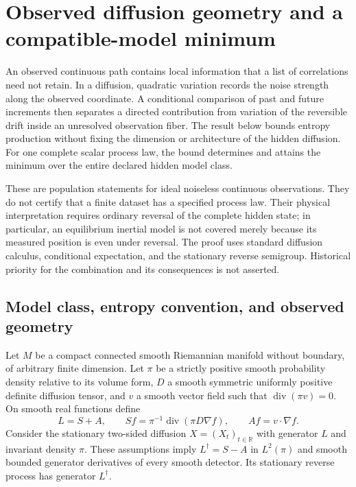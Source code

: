 \chapter{Observed diffusion geometry and a compatible-model minimum}
\label{ch:og-population}

An observed continuous path contains local information that a list of
correlations need not retain. In a diffusion, quadratic variation records the
noise strength along the observed coordinate. A conditional comparison of
past and future increments then separates a directed contribution from
variation of the reversible drift inside an unresolved observation fiber.
The result below bounds entropy production without fixing the dimension or
architecture of the hidden diffusion. For one complete scalar process law,
the bound determines and attains the minimum over the entire declared hidden
model class.

These are population statements for ideal noiseless continuous observations.
They do not certify that a finite dataset has a specified process law. Their
physical interpretation requires ordinary reversal of the complete hidden
state; in particular, an equilibrium inertial model is not covered merely
because its measured position is even under reversal. The proof uses standard
diffusion calculus, conditional expectation, and the stationary reverse
semigroup. Historical priority for the combination and its consequences is
not asserted.

\section{Model class, entropy convention, and observed geometry}

Let $M$ be a compact connected smooth Riemannian manifold without boundary,
of arbitrary finite dimension. Let $\pi$ be a strictly positive smooth
probability density relative to its volume form, $D$ a smooth symmetric
uniformly positive definite diffusion tensor, and $v$ a smooth vector field
such that $\operatorname{div}(\pi v)=0$. On smooth real functions define
\begin{equation}
 L=S+A,\qquad
 Sf=\pi^{-1}\operatorname{div}(\pi D\nabla f),\qquad
 Af=v\mathbin{\cdot}\nabla f.
 \label{eq:og-generator}
\end{equation}
Consider the stationary two-sided diffusion $X=(X_t)_{t\in\mathbb R}$ with
generator $L$ and invariant density $\pi$. These assumptions imply
$L^\dagger=S-A$ in $L^2(\pi)$ and smooth bounded generator derivatives of
every smooth detector. Its stationary reverse process has generator
$L^\dagger$.

